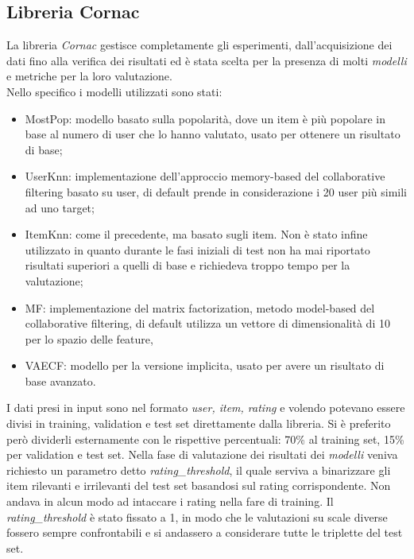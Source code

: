\subsection{Libreria Cornac}
La libreria \textit{Cornac} gestisce completamente gli esperimenti, dall'acquisizione dei dati fino alla verifica dei risultati ed è stata scelta per la presenza di molti \textit{modelli} e metriche per la loro valutazione.\\
Nello specifico i modelli utilizzati sono stati:
\begin{itemize}
    \item MostPop: modello basato sulla popolarità, dove un item è più popolare in base al numero di user che lo hanno valutato, usato per ottenere un risultato di base;
    \item UserKnn: implementazione dell'approccio memory-based del collaborative filtering basato su user, di default prende in considerazione i 20 user più simili ad uno target;
    \item ItemKnn: come il precedente, ma basato sugli item. Non è stato infine utilizzato in quanto durante le fasi iniziali di test non ha mai riportato risultati superiori a quelli di base e richiedeva troppo tempo per la valutazione;
    \item MF: implementazione del matrix factorization, metodo model-based del collaborative filtering, di default utilizza un vettore di dimensionalità di 10 per lo spazio delle feature,
    \item VAECF: modello per la versione implicita, usato per avere un risultato di base avanzato.
\end{itemize}
I dati presi in input sono nel formato \textit{user, item, rating} e volendo potevano essere divisi in training, validation e test set direttamente dalla libreria.
Si è preferito però dividerli esternamente con le rispettive percentuali: 70\% al training set, 15\% per validation e test set.
Nella fase di valutazione dei risultati dei \textit{modelli} veniva richiesto un parametro detto \textit{rating\_threshold}, il quale serviva a binarizzare gli item rilevanti e irrilevanti del test set basandosi sul rating corrispondente. Non andava in alcun modo ad intaccare i rating nella fare di training. Il \textit{rating\_threshold} è stato fissato a 1, in modo che le valutazioni su scale diverse fossero sempre confrontabili e si andassero a considerare tutte le triplette del test set.
 
